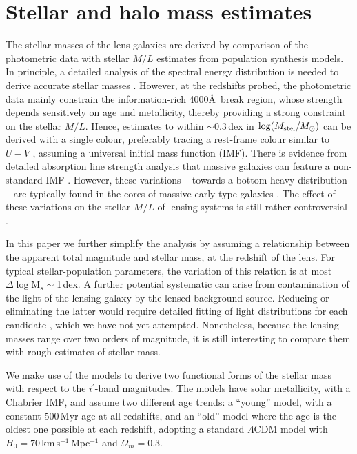 
\section{Stellar and halo mass estimates}
\label{sec:stellar-mass}

The stellar masses of the lens galaxies are derived by comparison of
the photometric data with stellar $M/L$ estimates from population
synthesis models.  In principle, a detailed analysis of the spectral
energy distribution is needed to derive accurate stellar masses
\citep[e.g.][]{2009ApJS..185..253G,2011MNRAS.418.1587T}.  However,
at the redshifts probed, the photometric data mainly
constrain the information-rich 4000\thinspace\AA~break region, whose
strength depends sensitively on age and metallicity, thereby
providing a strong constraint on the stellar $M/L$.  Hence,
estimates to within $\sim$0.3\,dex in $\log(M_\text{stel}/M_\odot)$ can be derived
with a single colour, preferably tracing a rest-frame colour similar
to $U-V$ \citep[see Fig.~1 of][]{2008MNRAS.383..857F}, assuming
a universal initial mass function (IMF).  There is
evidence from detailed absorption line strength analysis that massive
galaxies can feature a non-standard IMF 
\citep[e.g.][]{2013MNRAS.429L..15F}. However, these variations --
towards a bottom-heavy distribution -- are typically found in the
cores of massive early-type galaxies \citep{2016MNRAS.457.1468L}. The
effect of these variations on the stellar $M/L$ of lensing systems is
still rather controversial
\citep{2015MNRAS.449.3441S,2016MNRAS.459.3677L}.

In this paper we further simplify the analysis by assuming a
relationship between the apparent total magnitude and stellar mass, at
the redshift of the lens.  For typical stellar-population parameters,
the variation of this relation is at most $\Delta\log$M$_s\sim$1\,dex.
A further potential systematic can arise from contamination of the
light of the lensing galaxy by the lensed background source.  Reducing
or eliminating the latter would require detailed fitting of light
distributions for each candidate \citep[see][]{2011ApJ...740...97L},
which we have not yet attempted.  Nonetheless, because the lensing
masses range over two orders of magnitude, it is still interesting to
compare them with rough estimates of stellar mass.

We make use of the \citet{2003MNRAS.344.1000B} models to derive two
functional forms of the stellar mass with respect to the $i^{\prime}$-band
magnitudes. The models have solar metallicity, with a Chabrier IMF,
and assume two different age trends: a ``young'' model, with a
constant 500\,Myr age at all redshifts, and an ``old'' model where the
age is the oldest one possible at each redshift, adopting a standard
$\Lambda$CDM model with $H_0=70$\,km\,s$^{-1}$\,Mpc$^{-1}$ and
$\Omega_m=0.3$.

